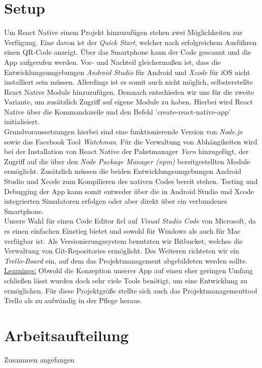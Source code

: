 \section{Setup}
Um React Native einem Projekt hinzuzufügen stehen zwei Möglichkeiten zur Verfügung.
Eine davon ist der \emph{Quick Start}, welcher nach erfolgreichem Ausführen einen QR-Code anzeigt.
Über das Smartphone kann der Code gescannt und die App aufgerufen werden.
Vor- und Nachteil gleichermaßen ist, dass die Entwicklungsumgebungen \emph{Android Studio} für Android und \emph{Xcode} für iOS nicht installiert sein müssen.
Allerdings ist es somit auch nicht möglich, selbsterstellte React Native Module hinzuzufügen.
Demnach entschieden wir uns für die zweite Variante, um zusätzlich Zugriff auf eigene Module zu haben.
Hierbei wird React Native über die Kommandozeile und den Befehl 'create-react-native-app' initialisiert.
\\
Grundvoraussetzungen hierbei sind eine funktionierende Version von \emph{Node.js} sowie das Facebook Tool \emph{Watchman}.
Für die Verwaltung von Abhängikeiten wird bei der Installation von React Native der Paketmanager \emph{Yarn} hinzugefügt, der Zugriff auf die über den \emph{Node Package Manager (npm)} bereitgestellten Module ermöglicht.
Zusätzlich müssen die beiden Entwicklungsumgebungen Android Studio und Xcode zum Kompilieren des nativen Codes bereit stehen.
Testing und Debugging der App kann somit entweder über die in Android Studio und Xcode integrierten Simulatoren erfolgen oder aber direkt über ein verbundenes Smartphone.
\\
Unsere Wahl für einen Code Editor fiel auf \emph{Visual Studio Code} von Microsoft, da es einen einfachen Einstieg bietet und sowohl für Windows als auch für Mac verfügbar ist.
Als Versionierungssystem benutzten wir Bitbucket, welches die Verwaltung von Git-Repositories ermöglicht.
Des Weiteren richteten wir ein \emph{Trello-Board} ein, auf dem das Projektmanagement abgebildeten werden sollte.
\\
\underline{Learnings:}
Obwohl die Konzeption unserer App auf einen eher geringen Umfang schließen lässt wurden doch sehr viele Tools benötigt, um eine Entwicklung zu ermöglichen.
Für diese Projektgröße stellte sich auch das Projektmanagementtool Trello als zu aufwändig in der Pflege heraus.



\section{Arbeitsaufteilung}
Zusammen angefangen

